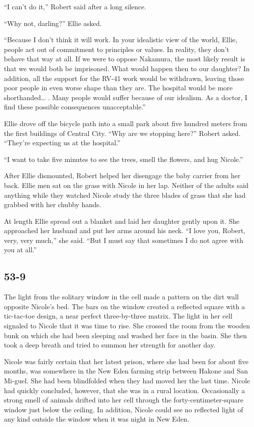 \documentclass[]{article}
\begin{document}
{{“I can’t do it,” Robert said after a long silence.

“Why not, darling?” Ellie asked.

“Because I don’t think it will work. In your idealistic view of the world, Ellie, people act out of commitment to principles or values. In reality, they don’t behave that way at all. If we were to oppose Nakamura, the most likely result is that we would both be imprisoned. What would happen then to our daughter? In addition, all the support for the RV-41 work would be withdrawn, leaving those poor people in even worse shape than they are. The hospital would be more shorthanded… . Many people would suffer because of our idealism. As a doctor, I find these possible consequences unacceptable.”

Ellie drove off the bicycle path into a small park about five hundred meters from the first buildings of Central City. “Why are we stopping here?” Robert asked. “They’re expecting us at the hospital.”

“I want to take five minutes to see the trees, smell the flowers, and hug Nicole.”

After Ellie dismounted, Robert helped her disengage the baby carrier from her back. Ellie men sat on the grass with Nicole in her lap. Neither of the adults said anything while they watched Nicole study the three blades of grass that she had grabbed with her chubby hands.

At length Ellie spread out a blanket and laid her daughter gently upon it. She approached her husband and put her arms around his neck. “I love you, Robert, very, very much,” she said. “But I must say that sometimes I do not agree with you at all.”


\subsection{53-9}

The light from the solitary window in the cell made a pattern on the dirt wall opposite Nicole’s bed. The bars on the window created a reflected square with a tic-tac-toe design, a near perfect three-by-three matrix. The light in her cell signaled to Nicole that it was time to rise. She crossed the room from the wooden bunk on which she had been sleeping and washed her face in the basin. She then took a deep breath and tried to summon her strength for another day.

Nicole was fairly certain that her latest prison, where she had been for about five months, was somewhere in the New Eden farming strip between Hakone and San Mi-guel. She had been blindfolded when they had moved her the last time. Nicole had quickly concluded, however, that she was in a rural location. Occasionally a strong smell of animals drifted into her cell through the forty-centimeter-square window just below the ceiling. In addition, Nicole could see no reflected light of any kind outside the window when it was night in New Eden.

}}
\end{document}
